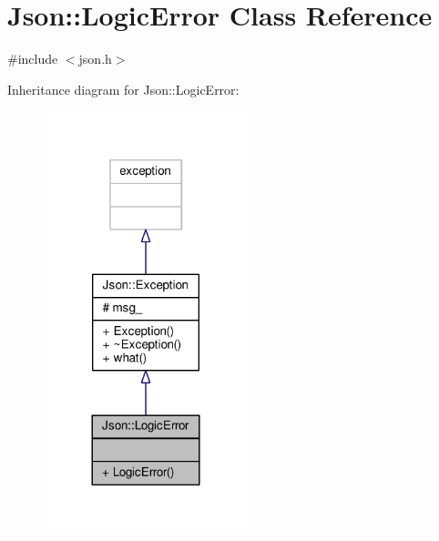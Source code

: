 \hypertarget{classJson_1_1LogicError}{}\section{Json\+:\+:Logic\+Error Class Reference}
\label{classJson_1_1LogicError}


{\ttfamily \#include $<$json.\+h$>$}



Inheritance diagram for Json\+:\+:Logic\+Error\+:
\nopagebreak
\begin{figure}[H]
\begin{center}
\leavevmode
\includegraphics[width=168pt]{db/de2/classJson_1_1LogicError__inherit__graph}
\end{center}
\end{figure}


